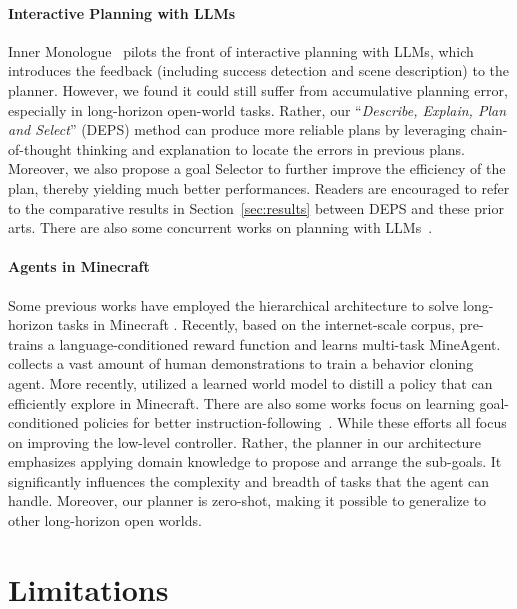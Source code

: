 \documentclass{article}
\begin{document}
\paragraph{Interactive Planning with LLMs} Inner Monologue~\cite{innermonologue} pilots the front of interactive planning with LLMs, which introduces the feedback (including success detection and scene description) to the planner. However, we found it could still suffer from accumulative planning error, especially in long-horizon open-world tasks. Rather, our ``\textit{Describe, Explain, Plan and Select}'' (DEPS) method can produce more reliable plans by leveraging chain-of-thought thinking and explanation to locate the errors in previous plans. Moreover, we also propose a goal Selector to further improve the efficiency of the plan, thereby yielding much better performances. Readers are encouraged to refer to the comparative results in Section~\ref{sec:results} between DEPS and these prior arts. There are also some concurrent works on planning with LLMs~\cite{reflexion,mai2023llm,text2motion,generativeagents,proagent}.

\paragraph{Agents in Minecraft} 
Some previous works have employed the hierarchical architecture to solve long-horizon tasks in Minecraft \cite{oh2017zero,mao2022seihai,lin2021juewu}. 
Recently, based on the internet-scale corpus, \cite{minedojo} pre-trains a language-conditioned reward function and learns multi-task MineAgent.
\cite{vpt} collects a vast amount of human demonstrations to train a behavior cloning agent. More recently, \cite{dreamerv3} utilized a learned world model to distill a policy that can efficiently explore in Minecraft. There are also some works focus on learning goal-conditioned policies for better instruction-following~\cite{shaofei,groot,steve1}. While these efforts all focus on improving the low-level controller. Rather, the planner in our architecture emphasizes applying domain knowledge to propose and arrange the sub-goals. It significantly influences the complexity and breadth of tasks that the agent can handle. Moreover, our planner is zero-shot, making it possible to generalize to other long-horizon open worlds.

\section{Limitations}
\end{document}
